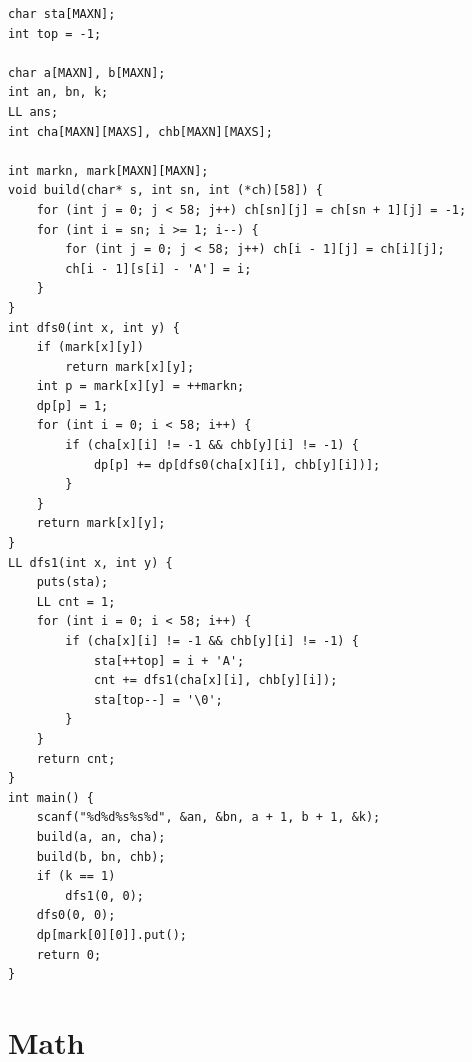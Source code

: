 \documentclass[10pt]{ctexart}
\begin{document}
{\begin{lstlisting}
char sta[MAXN];
int top = -1;

char a[MAXN], b[MAXN];
int an, bn, k;
LL ans;
int cha[MAXN][MAXS], chb[MAXN][MAXS];

int markn, mark[MAXN][MAXN];
void build(char* s, int sn, int (*ch)[58]) {
    for (int j = 0; j < 58; j++) ch[sn][j] = ch[sn + 1][j] = -1;
    for (int i = sn; i >= 1; i--) {
        for (int j = 0; j < 58; j++) ch[i - 1][j] = ch[i][j];
        ch[i - 1][s[i] - 'A'] = i;
    }
}
int dfs0(int x, int y) {
    if (mark[x][y])
        return mark[x][y];
    int p = mark[x][y] = ++markn;
    dp[p] = 1;
    for (int i = 0; i < 58; i++) {
        if (cha[x][i] != -1 && chb[y][i] != -1) {
            dp[p] += dp[dfs0(cha[x][i], chb[y][i])];
        }
    }
    return mark[x][y];
}
LL dfs1(int x, int y) {
    puts(sta);
    LL cnt = 1;
    for (int i = 0; i < 58; i++) {
        if (cha[x][i] != -1 && chb[y][i] != -1) {
            sta[++top] = i + 'A';
            cnt += dfs1(cha[x][i], chb[y][i]);
            sta[top--] = '\0';
        }
    }
    return cnt;
}
int main() {
    scanf("%d%d%s%s%d", &an, &bn, a + 1, b + 1, &k);
    build(a, an, cha);
    build(b, bn, chb);
    if (k == 1)
        dfs1(0, 0);
    dfs0(0, 0);
    dp[mark[0][0]].put();
    return 0;
}
\end{lstlisting}



\newpage
\section{Math}
}
\end{document}
